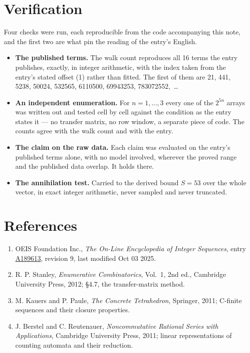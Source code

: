 \documentclass[11pt]{article}
\theoremstyle{definition}
\begin{document}
\section{Verification}

Four checks were run, each reproducible from the code accompanying this note, and the first two are what pin the reading of the entry's English.

\begin{itemize}

\item {\bfseries The published terms.} The walk count reproduces all 16 terms the entry publishes, exactly, in integer arithmetic, with the index taken from the entry's stated offset (1) rather than fitted. The first of them are 21, 441, 5238, 50024, 532565, 6110500, 69943253, 783072552,~\dots

\item {\bfseries An independent enumeration.} For $n = 1,\dots,3$ every one of the $2^{5n}$ arrays was written out and tested cell by cell against the condition as the entry states it --- no transfer matrix, no row window, a separate piece of code. The counts agree with the walk count and with the entry.

\item {\bfseries The claim on the raw data.} Each claim was evaluated on the entry's published terms alone, with no model involved, wherever the proved range and the published data overlap. It holds there.

\item {\bfseries The annihilation test.} Carried to the derived bound $S = 53$ over the whole vector, in exact integer arithmetic, never sampled and never truncated.

\end{itemize}

\section{References}

\begin{enumerate}

\item OEIS Foundation Inc., \emph{The On-Line Encyclopedia of Integer Sequences}, entry \href{https://oeis.org/A189613}{A189613}, revision 9, last modified Oct 03 2025.

\item R. P. Stanley, \emph{Enumerative Combinatorics}, Vol.~1, 2nd ed., Cambridge University Press, 2012; \S4.7, the transfer-matrix method.

\item M. Kauers and P. Paule, \emph{The Concrete Tetrahedron}, Springer, 2011; C-finite sequences and their closure properties.

\item J. Berstel and C. Reutenauer, \emph{Noncommutative Rational Series with Applications}, Cambridge University Press, 2011; linear representations of counting automata and their reduction.

\end{enumerate}
\end{document}
